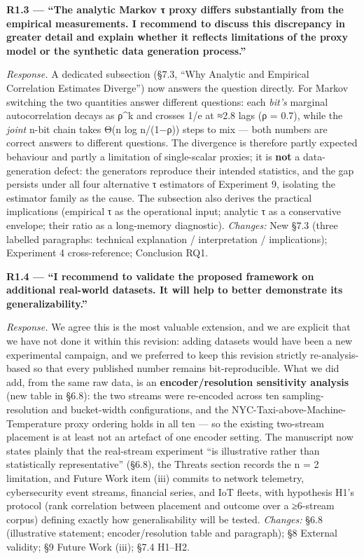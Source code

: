 \documentclass[
  11pt,
]{article}
\begin{document}
\textbf{R1.3 --- ``The analytic Markov τ proxy differs substantially
from the empirical measurements. I recommend to discuss this discrepancy
in greater detail and explain whether it reflects limitations of the
proxy model or the synthetic data generation process.''}

\emph{Response.} A dedicated subsection (§7.3, ``Why Analytic and
Empirical Correlation Estimates Diverge'') now answers the question
directly. For Markov switching the two quantities answer different
questions: each \emph{bit's} marginal autocorrelation decays as ρ\^{}k
and crosses 1/e at ≈2.8 lags (ρ = 0.7), while the \emph{joint} n-bit
chain takes Θ(n log n/(1−ρ)) steps to mix --- both numbers are correct
answers to different questions. The divergence is therefore partly
expected behaviour and partly a limitation of single-scalar proxies; it
is \textbf{not} a data-generation defect: the generators reproduce their
intended statistics, and the gap persists under all four alternative τ
estimators of Experiment 9, isolating the estimator family as the cause.
The subsection also derives the practical implications (empirical τ as
the operational input; analytic τ as a conservative envelope; their
ratio as a long-memory diagnostic). \emph{Changes:} New §7.3 (three
labelled paragraphs: technical explanation / interpretation /
implications); Experiment 4 cross-reference; Conclusion RQ1.

\textbf{R1.4 --- ``I recommend to validate the proposed framework on
additional real-world datasets. It will help to better demonstrate its
generalizability.''}

\emph{Response.} We agree this is the most valuable extension, and we
are explicit that we have not done it within this revision: adding
datasets would have been a new experimental campaign, and we preferred
to keep this revision strictly re-analysis-based so that every published
number remains bit-reproducible. What we did add, from the same raw
data, is an \textbf{encoder/resolution sensitivity analysis} (new table
in §6.8): the two streams were re-encoded across ten sampling-resolution
and bucket-width configurations, and the
NYC-Taxi-above-Machine-Temperature proxy ordering holds in all ten ---
so the existing two-stream placement is at least not an artefact of one
encoder setting. The manuscript now states plainly that the real-stream
experiment ``is illustrative rather than statistically representative''
(§6.8), the Threats section records the n = 2 limitation, and Future
Work item (iii) commits to network telemetry, cybersecurity event
streams, financial series, and IoT fleets, with hypothesis H1's protocol
(rank correlation between placement and outcome over a ≥6-stream corpus)
defining exactly how generalisability will be tested. \emph{Changes:}
§6.8 (illustrative statement; encoder/resolution table and paragraph);
§8 External validity; §9 Future Work (iii); §7.4 H1--H2.
\end{document}
